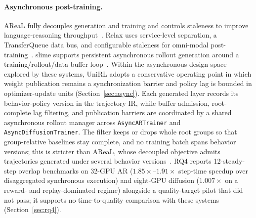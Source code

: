 \documentclass[10pt]{article}
\begin{document}
\paragraph{Asynchronous post-training.}
AReaL fully decouples generation and training and controls staleness to improve language-reasoning throughput~\citep{fu2025areal}.
Relax uses service-level separation, a TransferQueue data bus, and configurable staleness for omni-modal post-training~\citep{zhang2026relax}.
slime supports persistent asynchronous rollout generation around a training/rollout/data-buffer loop~\citep{slime2025}.
Within the asynchronous design space explored by these systems, UniRL adopts a conservative operating point in which weight publication remains a synchronization barrier and policy lag is bounded in optimizer-update units (Section~\ref{sec:async}).
Each generated layer records its behavior-policy version in the trajectory IR, while buffer admission, root-complete lag filtering, and publication barriers are coordinated by a shared asynchronous rollout manager across \texttt{AsyncARTrainer} and \texttt{AsyncDiffusionTrainer}.
The filter keeps or drops whole root groups so that group-relative baselines stay complete, and no training batch spans behavior versions; this is stricter than AReaL, whose decoupled objective admits trajectories generated under several behavior versions~\citep{fu2025areal}.
RQ4 reports 12-steady-step overlap benchmarks on 32-GPU AR ($1.85\times$--$1.91\times$ step-time speedup over disaggregated synchronous execution) and eight-GPU diffusion ($1.007\times$ on a reward- and replay-dominated regime) alongside a quality-target pilot that did not pass; it supports no time-to-quality comparison with these systems (Section~\ref{sec:rq4}).
\end{document}
